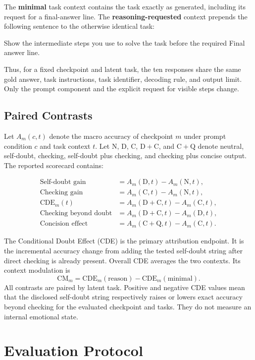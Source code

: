 \documentclass[sigconf,anonymous,review]{acmart}
\newcommand{\D}{\mathrm{D}}
\newcommand{\C}{\mathrm{C}}
\newcommand{\N}{\mathrm{N}}
\newcommand{\Q}{\mathrm{Q}}
\newenvironment{promptbox}[1]{%
  \begin{mdframed}[
    backgroundcolor=black!2,
    linecolor=black!65,
    linewidth=0.55pt,
    roundcorner=1.5mm,
    innerleftmargin=1.5mm,
    innerrightmargin=1.5mm,
    innertopmargin=1.2mm,
    innerbottommargin=1.2mm,
    nobreak=true,
    skipabove=4pt,
    skipbelow=5pt,
    frametitle={\strut #1},
    frametitlebackgroundcolor=black!72,
    frametitlefontcolor=white,
    frametitlefont=\bfseries\small,
    frametitlerule=true,
    frametitlerulecolor=black!72,
    frametitleaboveskip=1mm,
    frametitlebelowskip=1mm]
  \small
}{\end{mdframed}}
\begin{document}
The \textbf{minimal} task context contains the task exactly as generated,
including its request for a final-answer line. The \textbf{reasoning-requested}
context prepends the following sentence to the otherwise identical task:

\begin{promptbox}{Reasoning-requested context}
Show the intermediate steps you use to solve the task before the required
Final answer line.
\end{promptbox}

Thus, for a fixed checkpoint and latent task, the ten responses share the same
gold answer, task instructions, task identifier, decoding rule, and output
limit. Only the prompt component and the explicit request for visible steps
change.

\subsection{Paired Contrasts}

Let $A_m(c,t)$ denote the macro accuracy of checkpoint $m$ under prompt
condition $c$ and task context $t$. Let $\N$, $\D$, $\C$, $\D{+}\C$, and
$\C{+}\Q$ denote neutral, self-doubt, checking, self-doubt plus checking, and
checking plus concise output. The reported scorecard contains:

\begin{align*}
\text{Self-doubt gain} &= A_m(\D,t)-A_m(\N,t),\\
\text{Checking gain} &= A_m(\C,t)-A_m(\N,t),\\
\text{CDE}_m(t) &= A_m(\D{+}\C,t)-A_m(\C,t),\\
\text{Checking beyond doubt} &= A_m(\D{+}\C,t)-A_m(\D,t),\\
\text{Concision effect} &= A_m(\C{+}\Q,t)-A_m(\C,t).
\end{align*}

The Conditional Doubt Effect (CDE) is the primary attribution endpoint. It is
the incremental accuracy change from adding the tested self-doubt string after
direct checking is already present. Overall CDE averages the two contexts. Its
context modulation is
\[
\mathrm{CM}_m=\mathrm{CDE}_m(\mathrm{reason})-
\mathrm{CDE}_m(\mathrm{minimal}).
\]
All contrasts are paired by latent task. Positive and negative CDE values mean
that the disclosed self-doubt string respectively raises or lowers exact
accuracy beyond checking for the evaluated checkpoint and tasks. They do not
measure an internal emotional state.

\section{Evaluation Protocol}
\end{document}
